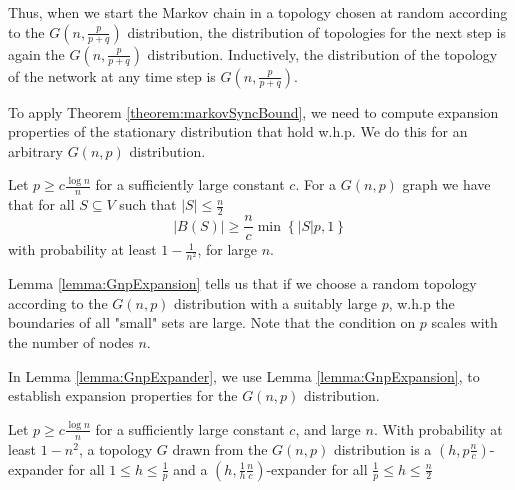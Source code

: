 Thus, when we start the Markov chain in a topology chosen at random according to the $G(n, \frac{p}{p+q})$ distribution, the distribution of topologies for the next step is again the $G(n, \frac{p}{p+q})$ distribution. Inductively, the distribution of the topology of the network at any time step is $G(n, \frac{p}{p+q})$.

To apply Theorem \ref{theorem:markovSyncBound}, we need to compute expansion properties of the stationary distribution that hold w.h.p. We do this for an arbitrary $G(n, p)$ distribution.

\begin{lemma}\label{lemma:GnpExpansion}
	Let $p \geq c\frac{\log n}{n}$ for a sufficiently large constant $c$. For a $G(n, p)$ graph we have that for all $S \subseteq V$ such that $|S| \leq \frac{n}{2}$
	$$
		|B(S)| \geq \frac{n}{c} \min \left\{ |S|p, 1 \right\} 
	$$
	with probability at least $1 - \frac{1}{n^2}$, for large $n$. 
\end{lemma}


Lemma \ref{lemma:GnpExpansion} tells us that if we choose a random topology according to the $G(n, p)$ distribution with a suitably large $p$, w.h.p the boundaries of all "small" sets are large. Note that the condition on $p$ scales with the number of nodes $n$. %

In Lemma \ref{lemma:GnpExpander}, we use Lemma \ref{lemma:GnpExpansion}, to establish expansion properties for the $G(n,p)$ distribution.


\begin{lemma}\label{lemma:GnpExpander}
	Let $p \geq c\frac{\log n}{n}$ for a sufficiently large constant $c$, and large $n$. With probability at least $1- n^2$, a topology $G$ drawn from the $G(n, p)$ distribution is a $(h, p\frac{n}{c})$-expander for all $1 \leq h \leq \frac{1}{p}$ and a $(h, \frac{1}{h}\frac{n}{c})$-expander for all $\frac{1}{p} \leq h \leq \frac{n}{2}$
\end{lemma}

